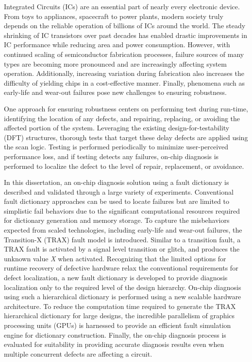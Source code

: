 Integrated Circuits (ICs) are an essential part of nearly every electronic device.
%
From toys to appliances, spacecraft to power plants, modern society truly depends on the reliable operation of billions of ICs around the world.
%
The steady shrinking of IC transistors over past decades has enabled drastic improvements in IC performance while reducing area and power consumption.
%
However, with continued scaling of semiconductor fabrication processes, failure sources of many types are becoming more pronounced and are increasingly affecting system operation.
%
Additionally, increasing variation during fabrication also increases the difficulty of yielding chips in a cost-effective manner.
%
Finally, phenomena such as early-life and wear-out failures pose new challenges to ensuring robustness.

One approach for ensuring robustness centers on performing test during run-time, identifying the location of any defects, and repairing, replacing, or avoiding the affected portion of the system.
%
Leveraging the existing design-for-testability (DFT) structures, thorough tests that target these delay defects are applied using the scan logic.
%
Testing is performed periodically to minimize user-perceived performance loss, and if testing detects any failures, on-chip diagnosis is performed to localize the defect to the level of repair, replacement, or avoidance.

In this dissertation, an on-chip diagnosis solution using a fault dictionary is described and validated through a large variety of experiments.
%
Conventional fault dictionary approaches can be used to locate failures but are limited to simplistic fail behaviors due to the significant computational resources required for dictionary generation and memory storage.
%
To capture the misbehaviors expected from scaled technologies, including early-life and wear-out failures, the Transition-X (TRAX) fault model is introduced.
%
Similar to a transition fault, a TRAX fault is activated by a signal level transition or glitch, and produces the unknown value \textit{X} when activated.
%
Recognizing that the limited options for runtime recovery of defective hardware relax the conventional requirements for defect localization, a new fault dictionary is developed to provide diagnosis localization only to the required level of the design hierarchy.
%
On-chip diagnosis using such a hierarchical dictionary is performed using a new scalable hardware architecture.
%
To reduce the computation time required to generate the TRAX hierarchical dictionary for large designs, the incredible parallelism of graphics processing units (GPUs) is harnessed to provide an efficient fault simulation engine for dictionary construction.
%
Finally, the on-chip diagnosis process is evaluated for suitability in providing accurate diagnosis results even when multiple concurrent defects are affecting a circuit.
